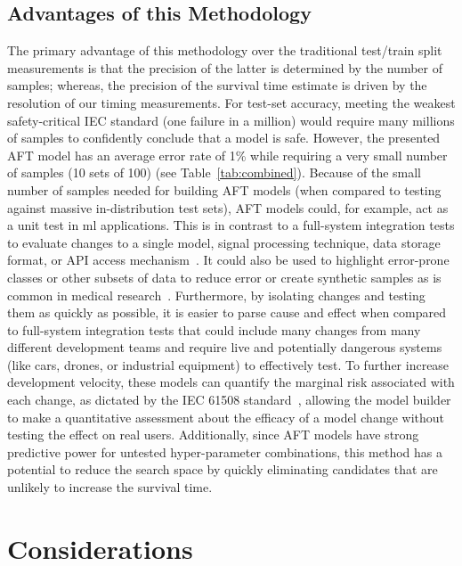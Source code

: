 \documentclass[sn-mathphys-num]{sn-jnl}%
\begin{document}
\subsection{Advantages of this Methodology}
\label{advantages}
The primary advantage of this methodology over the traditional test/train split measurements is that the precision of the latter is determined by the number of samples; whereas, the precision of the survival time estimate is driven by the resolution of our timing measurements. 
For test-set accuracy,  meeting the weakest safety-critical IEC standard (one failure in a million) would require many millions of samples to confidently conclude that a model is safe. However, the presented AFT model has an average error rate of 1\% while requiring a very small number of samples (10 sets of 100) (see Table~\ref{tab:combined}). 
Because of the small number of samples needed for building AFT models (when compared to testing against massive in-distribution test sets), AFT models could, for example, act as a unit test in \acrshort{ml} applications. 
This is in contrast to a full-system integration tests to evaluate changes to a single model, signal processing technique, data storage format, or API access mechanism~\cite{schmoor2000sample,lachin1981introduction}. 
It could also be used to highlight error-prone classes or other subsets of data to reduce error or create synthetic samples as is common in medical research~\cite{kleinbaum1996survival}. 
Furthermore, by isolating changes and testing them as quickly as possible, it is easier to parse cause and effect when compared to full-system integration tests that could include many changes from many different development teams and require live and potentially dangerous systems (like cars, drones, or industrial equipment) to effectively test. 
To further increase development velocity, these models can quantify the marginal risk associated with each change, as dictated by the IEC 61508 standard~\cite{IEC61508}, allowing the model builder to make a quantitative assessment about the efficacy of a model change without testing the effect on real users. 
Additionally, since AFT models have strong predictive power for untested hyper-parameter combinations, this method has a potential to reduce the search space by quickly eliminating candidates that are unlikely to increase the survival time. 

\section{Considerations}
\label{considerations}
\end{document}
